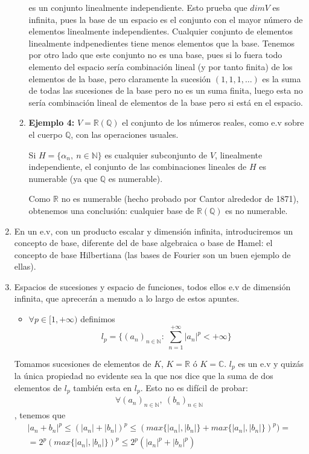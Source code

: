 \documentclass{article}
\begin{document}
\begin{enumerate}
\begin{enumerate}
	es un conjunto linealmente independiente. Esto prueba que $dim V$ es infinita, pues la base de un espacio es el conjunto con el mayor número de elementos linealmente independientes. Cualquier conjunto de elementos linealmente indpenedientes tiene menos elementos que la base. Tenemos por otro lado que este conjunto no es una base, pues si lo fuera todo elemento del espacio sería combinación lineal (y por tanto finita) de los elementos de la base, pero claramente la sucesión $(1,1,1,\ldots)$ es la suma de todas las sucesiones de la base pero no es un suma finita, luego esta no sería combinación lineal de elementos de la base pero si está en el espacio.
	
	\item \textbf{Ejemplo 4:} $V=\mathbb{R}(\mathbb{Q})$ el conjunto de los números reales, como e.v sobre el cuerpo $\mathbb{Q}$, con las operaciones usuales.
	
	Si $H=\{\alpha_n,\:n\in \mathbb{N}\}$ es cualquier subconjunto de $V$, linealmente independiente, el conjunto de las combinaciones lineales de $H$ es numerable (ya que $\mathbb{Q}$ es numerable). 
	
	Como $\mathbb{R}$ no es numerable (hecho probado por Cantor alrededor de 1871), obtenemos una conclusión: cualquier base de $\mathbb{R}(\mathbb{Q})$ es no numerable.
	\end{enumerate}
	
\item En un e.v, con un producto escalar y dimensión infinita, introduciremos un concepto de base, diferente del de base algebraica o base de Hamel: el concepto de base   Hilbertiana (las bases de Fourier son un buen ejemplo de ellas).

\item Espacios de sucesiones y espacio de funciones, todos ellos e.v de dimensión infinita, que aprecerán a menudo a lo largo de estos apuntes.
	\begin{itemize}
	\item $\forall p\in [1,+\infty)$ definimos
	\begin{equation*}
	l_p=\{(a_n)_{n\in\mathbb{N}}:\:\sum_{n=1}^{+\infty}|a_n|^p<+\infty\}
	\end{equation*}
	\end{itemize}
	
Tomamos sucesiones de elementos de $K$, $K=\mathbb{R}$ ó $K=\mathbb{C}$. $l_p$ es un e.v y quizás la única propiedad no evidente sea la que nos dice que la suma de dos elementos de $l_p$ también esta en $l_p$. Esto no es difícil de probar: 
\begin{gather*}
\forall(a_n)_{n\in\mathbb{N}},\:(b_n)_{n\in\mathbb{N}}
\end{gather*}
, tenemos que
\begin{gather*}
|a_n+b_n|^p\leq (|a_n|+|b_n|)^p\leq (max\{|a_n|,|b_n|\}+max\{|a_n|,|b_n|\})^p)=\\
=2^p(max\{|a_n|,|b_n|\})^p\leq 2^p(|a_n|^p+|b_n|^p)
\end{gather*}


\end{enumerate}
\end{document}
